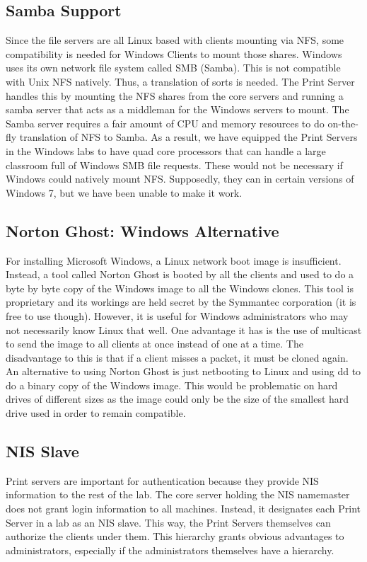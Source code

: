 \subsection{Samba Support}
Since the file servers are all Linux based with clients mounting via NFS, some compatibility is needed for Windows Clients to mount those shares.  Windows uses its own network file system called SMB (Samba).  This is not compatible with Unix NFS natively.  Thus, a translation of sorts is needed.  The Print Server handles this by mounting the NFS shares from the core servers and running a samba server that acts as a middleman for the Windows servers to mount.  The Samba server requires a fair amount of CPU and memory resources to do on-the-fly translation of NFS to Samba. As a result, we have equipped the Print Servers in the Windows labs to have quad core processors that can handle a large classroom full of Windows SMB file requests. These would not be necessary if Windows could natively mount NFS. Supposedly, they can in certain versions of Windows 7, but we have been unable to make it work.

\subsection{Norton Ghost:  Windows Alternative}
For installing Microsoft Windows, a Linux network boot image is insufficient.  Instead, a tool called Norton Ghost is booted by all the clients and used to do a byte by byte copy of the Windows image to all the Windows clones.  This tool is proprietary and its workings are held secret by the Symmantec corporation (it is free to use though).  However, it is useful for Windows administrators who may not necessarily know Linux that well.  One advantage it has is the use of multicast to send the image to all clients at once instead of one at a time.  The disadvantage to this is that if a client misses a packet, it must be cloned again.  An alternative to using Norton Ghost is just netbooting to Linux and using dd to do a binary copy of the Windows image.  This would be problematic on hard drives of different sizes as the image could only be the size of the smallest hard drive used in order to remain compatible.  

\subsection{NIS Slave}
Print servers are important for authentication because they provide NIS information to the rest of the lab.  The core server holding the NIS namemaster does not grant login information to all machines.  Instead, it designates each Print Server in a lab as an NIS slave.  This way, the Print Servers themselves can authorize the clients under them.  This hierarchy grants obvious advantages to administrators, especially if the administrators themselves have a hierarchy.  
